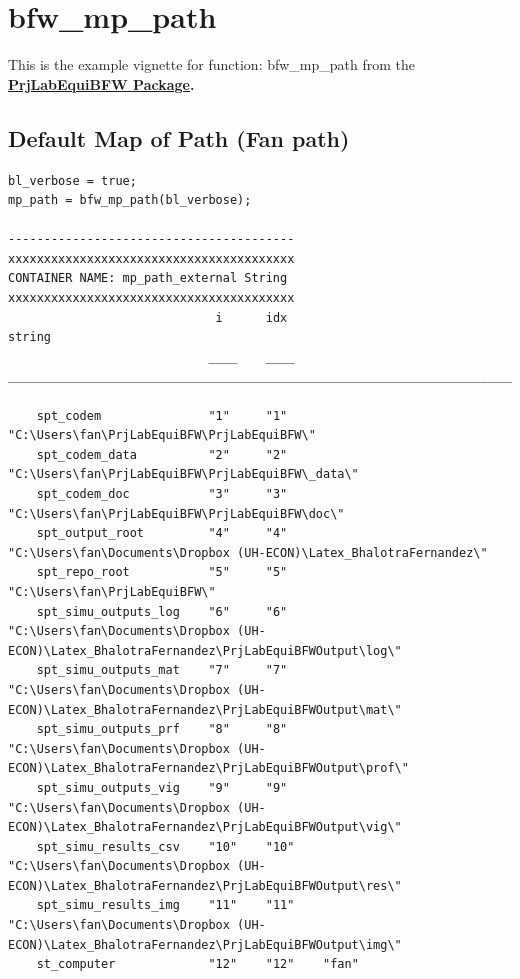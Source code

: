 \documentclass[
]{book}
\begin{document}
\hypertarget{bfw_mp_path}{%
\section{bfw\_mp\_path}\label{bfw_mp_path}}

This is the example vignette for function: bfw\_mp\_path from the
\href{https://fanwangecon.github.io/PrjLabEquiBFW/}{\textbf{PrjLabEquiBFW
Package}}\textbf{.}

\hypertarget{default-map-of-path-fan-path}{%
\subsection{Default Map of Path (Fan path)}\label{default-map-of-path-fan-path}}

\begin{verbatim}
bl_verbose = true;
mp_path = bfw_mp_path(bl_verbose);

----------------------------------------
xxxxxxxxxxxxxxxxxxxxxxxxxxxxxxxxxxxxxxxx
CONTAINER NAME: mp_path_external String
xxxxxxxxxxxxxxxxxxxxxxxxxxxxxxxxxxxxxxxx
                             i      idx                                                string                                           
                            ____    ____    ____________________________________________________________________________________________

    spt_codem               "1"     "1"     "C:\Users\fan\PrjLabEquiBFW\PrjLabEquiBFW\"                                                 
    spt_codem_data          "2"     "2"     "C:\Users\fan\PrjLabEquiBFW\PrjLabEquiBFW\_data\"                                           
    spt_codem_doc           "3"     "3"     "C:\Users\fan\PrjLabEquiBFW\PrjLabEquiBFW\doc\"                                             
    spt_output_root         "4"     "4"     "C:\Users\fan\Documents\Dropbox (UH-ECON)\Latex_BhalotraFernandez\"                         
    spt_repo_root           "5"     "5"     "C:\Users\fan\PrjLabEquiBFW\"                                                               
    spt_simu_outputs_log    "6"     "6"     "C:\Users\fan\Documents\Dropbox (UH-ECON)\Latex_BhalotraFernandez\PrjLabEquiBFWOutput\log\" 
    spt_simu_outputs_mat    "7"     "7"     "C:\Users\fan\Documents\Dropbox (UH-ECON)\Latex_BhalotraFernandez\PrjLabEquiBFWOutput\mat\" 
    spt_simu_outputs_prf    "8"     "8"     "C:\Users\fan\Documents\Dropbox (UH-ECON)\Latex_BhalotraFernandez\PrjLabEquiBFWOutput\prof\"
    spt_simu_outputs_vig    "9"     "9"     "C:\Users\fan\Documents\Dropbox (UH-ECON)\Latex_BhalotraFernandez\PrjLabEquiBFWOutput\vig\" 
    spt_simu_results_csv    "10"    "10"    "C:\Users\fan\Documents\Dropbox (UH-ECON)\Latex_BhalotraFernandez\PrjLabEquiBFWOutput\res\" 
    spt_simu_results_img    "11"    "11"    "C:\Users\fan\Documents\Dropbox (UH-ECON)\Latex_BhalotraFernandez\PrjLabEquiBFWOutput\img\" 
    st_computer             "12"    "12"    "fan"                                                                                       
\end{verbatim}
\end{document}
